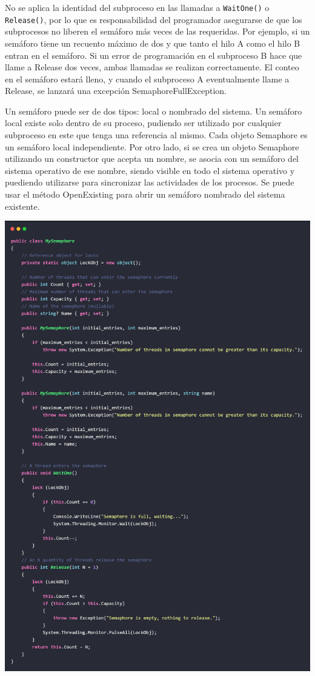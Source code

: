 \documentclass[10pt]{article} %
\newcommand{\csl}[1]{\colorbox{backcolour}{\texttt{#1}}}
\begin{document}
No se aplica la identidad del subproceso en las llamadas a \csl{WaitOne()} o \csl{Release()}, por lo que es responsabilidad del programador asegurarse de que los subprocesos no liberen el semáforo m\'as veces de las requeridas. Por ejemplo, si un semáforo tiene un recuento máximo de dos y que tanto el hilo A como el hilo B entran en el semáforo. Si un error de programación en el subproceso B hace que llame a Release dos veces, ambas llamadas se realizan correctamente. El conteo en el semáforo estar\'a lleno, y cuando el subproceso A eventualmente llame a Release, se lanzar\'a una excepci\'on SemaphoreFullException.

Un sem\'aforo puede ser de dos tipos: local o nombrado del sistema. Un semáforo local existe solo dentro de su proceso, pudiendo ser utilizado por cualquier subproceso en este que tenga una referencia al mismo. Cada objeto Semaphore es un semáforo local independiente. Por otro lado, si se crea un objeto Semaphore utilizando un constructor que acepta un nombre, se asocia con un semáforo del sistema operativo de ese nombre, siendo visible en todo el sistema operativo y puediendo utilizarse para sincronizar las actividades de los procesos. Se puede usar el método OpenExisting para abrir un semáforo nombrado del sistema existente.

\includegraphics[width=15cm]{MySemaphore.jpg}
\end{document}
